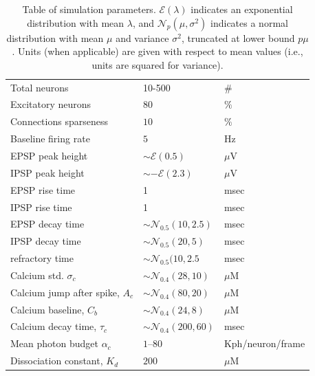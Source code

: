 \begin{table}[h!b!p!]
\caption{Table of simulation parameters. $\mathcal{E}(\lambda)$ indicates an exponential distribution with mean $\lambda$, and $\mathcal{N}_p(\mu,\sigma^2)$ indicates a normal distribution with mean $\mu$ and variance $\sigma^2$, truncated at lower bound $p\mu$.  Units (when applicable) are given with respect to mean values (i.e., units are squared for variance).}\label{table:caparm}

\begin{tabular}{lll}
\hline
Total neurons & 10-500 & \# \\
Excitatory neurons & $80$ & $\%$ \\
Connections sparseness & $10$   & $\%$ \\
Baseline firing rate & $5$ & Hz\\
\hline
EPSP peak height 	& $\sim \mathcal{E}(0.5)$ & $\mu$V \\
IPSP peak height 	& $\sim -\mathcal{E}(2.3)$ & $\mu$V \\
EPSP rise time 		& 1 & msec \\
IPSP rise time 		& 1 & msec \\
EPSP decay time 	& $\sim \mathcal{N}_{0.5}(10,2.5)$ & msec \\
IPSP decay time 	& $\sim \mathcal{N}_{0.5}(20,5)$ & msec\\
refractory time 	& $\sim \mathcal{N}_{0.5}(10,2.5$ & msec \\
\hline
Calcium std. $\sigma_c$ & $\sim \mathcal{N}_{0.4}(28,10)$ & $\mu$M\\
Calcium jump after spike, $A_c$ &  $\sim \mathcal{N}_{0.4}(80,20)$ & $\mu$M\\
Calcium baseline, $C_b$ & $\sim \mathcal{N}_{0.4}(24,8)$ & $\mu$M\\
Calcium decay time, $\tau_c$ & $\sim \mathcal{N}_{0.4}(200,60)$ & msec\\
Mean photon budget $\alpha_c$ & $1$--$80$ & Kph/neuron/frame \\
Dissociation constant, $K_d$ & $200$ & $\mu$M \\
\hline
\end{tabular}
\end{table}